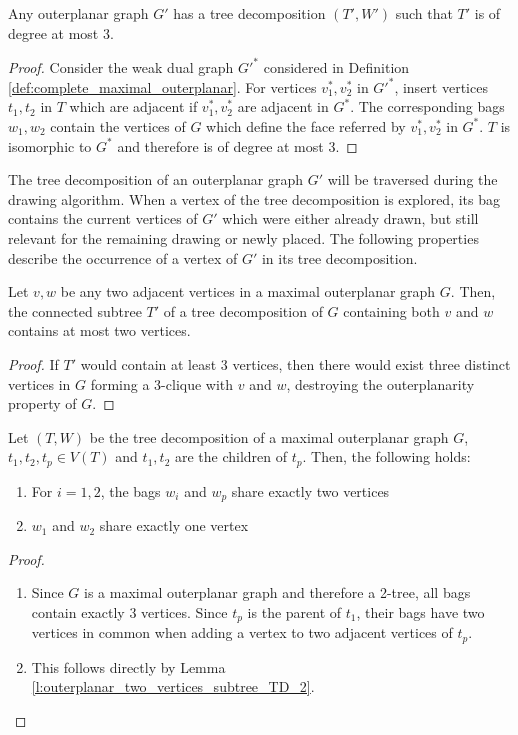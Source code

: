 \begin{lemma}\label{l:outerplanar_tree_decomposition}
	Any outerplanar graph $G'$ has a tree decomposition $(T',W')$ such that $T'$ is of degree at most 3.
\end{lemma}
\begin{proof}
	Consider the weak dual graph $G'^*$ considered in Definition \ref{def:complete_maximal_outerplanar}. For vertices $v_1^*,v_2^*$ in $G'^*$, insert vertices $t_1,t_2$ in $T$ which are adjacent if $v_1^*,v_2^*$ are adjacent in $G^*$. The corresponding bags $w_1, w_2$ contain the vertices of $G$ which define the face referred by $v_1^*,v_2^*$ in $G^*$. $T$ is isomorphic to $G^*$ and therefore is of degree at most 3.
\end{proof}
The tree decomposition of an outerplanar graph $G'$ will be traversed during the drawing algorithm. When a vertex of the tree decomposition is explored, its bag contains the current vertices of $G'$ which were either already drawn, but still relevant for the remaining drawing or newly placed. The following properties describe the occurrence of a vertex of $G'$ in its tree decomposition.
\begin{lemma}\label{l:outerplanar_two_vertices_subtree_TD_2}
	Let $v,w$ be any two adjacent vertices in a maximal outerplanar graph $G$. Then, the connected subtree $T'$ of a tree decomposition of $G$ containing both $v$ and $w$ contains at most two vertices.
\end{lemma}
\begin{proof}
	If $T'$ would contain at least 3 vertices, then there would exist three distinct vertices in $G$ forming a 3-clique with $v$ and $w$, destroying the outerplanarity property of $G$.
\end{proof}

\begin{lemma}\label{l:outerplanar_TD_properties}
	Let $(T,W)$ be the tree decomposition of a maximal outerplanar graph $G$, $t_1,t_2,t_p \in V(T)$ and $t_1, t_2$ are the children of $t_p$. Then, the following holds:
	\begin{enumerate}
		\item For $i = 1,2$, the bags $w_i$ and $w_p$ share exactly two vertices
		\item $w_1$ and $w_2$ share exactly one vertex
	\end{enumerate}
\end{lemma}
\begin{proof}
	\begin{enumerate}
		\item Since $G$ is a maximal outerplanar graph and therefore a 2-tree, all bags contain exactly 3 vertices. Since $t_p$ is the parent of $t_1$, their bags have two vertices in common when adding a vertex to two adjacent vertices of $t_p$.
		\item This follows directly by Lemma \ref{l:outerplanar_two_vertices_subtree_TD_2}.
	\end{enumerate}
\end{proof}

